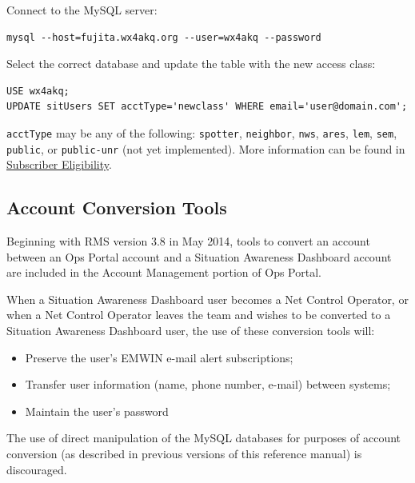 \documentclass[pdflatex,letterpaper,twoside,12pt]{book}
\begin{document}
Connect to the MySQL server:

\begin{verbatim}
mysql --host=fujita.wx4akq.org --user=wx4akq --password
\end{verbatim}

Select the correct database and update the table with the new access class:

\begin{verbatim}
USE wx4akq;
UPDATE sitUsers SET acctType='newclass' WHERE email='user@domain.com';
\end{verbatim}

\verb|acctType| may be any of the following:  \verb|spotter|, \verb|neighbor|, \verb|nws|, \verb|ares|, \verb|lem|, \verb|sem|, \verb|public|, or \verb|public-unr| (not yet implemented).  More information can be found in \hyperref[sec:eligibility]{Subscriber Eligibility}.

\subsection{Account Conversion Tools}\label{sit-account-conversion}

Beginning with RMS version 3.8 in May 2014, tools to convert an account between an Ops Portal account and a Situation Awareness Dashboard account are included in the Account Management portion of Ops Portal.

When a Situation Awareness Dashboard user becomes a Net Control Operator, or when a Net Control Operator leaves the team and wishes to be converted to a Situation Awareness Dashboard user, the use of these conversion tools will:

\begin{itemize}
\item Preserve the user's EMWIN e-mail alert subscriptions;
\item Transfer user information (name, phone number, e-mail) between systems;
\item Maintain the user's password
\end{itemize}

The use of direct manipulation of the MySQL databases for purposes of account conversion (as described in previous versions of this reference manual) is discouraged.

\end{document}
